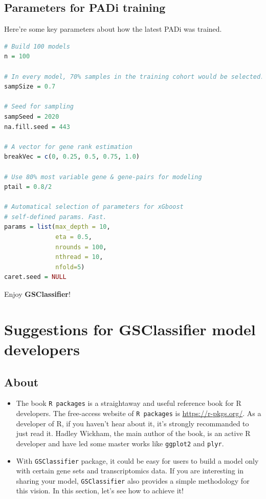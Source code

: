 \documentclass[
  12pt,
]{book}
\newcommand{\passthrough}[1]{#1}
\begin{document}
\hypertarget{padiPara}{%
\section{Parameters for PADi training}\label{padiPara}}

Here're some key parameters about how the latest PADi was trained.

\begin{lstlisting}[language=R]
# Build 100 models
n = 100

# In every model, 70% samples in the training cohort would be selected.
sampSize = 0.7

# Seed for sampling
sampSeed = 2020
na.fill.seed = 443

# A vector for gene rank estimation
breakVec = c(0, 0.25, 0.5, 0.75, 1.0)

# Use 80% most variable gene & gene-pairs for modeling
ptail = 0.8/2

# Automatical selection of parameters for xGboost
# self-defined params. Fast.
params = list(max_depth = 10,
              eta = 0.5,
              nrounds = 100,
              nthread = 10,
              nfold=5)
caret.seed = NULL
\end{lstlisting}

Enjoy \textbf{GSClassifier}!

\hypertarget{suggestions-for-gsclassifier-model-developers}{%
\chapter{Suggestions for GSClassifier model developers}\label{suggestions-for-gsclassifier-model-developers}}

\hypertarget{about-3}{%
\section{About}\label{about-3}}

\begin{itemize}
\item
  The book \passthrough{\lstinline!R packages!} is a straightaway and useful reference book for R developers. The free-access website of \passthrough{\lstinline!R packages!} is \url{https://r-pkgs.org/}. As a developer of R, if you haven't hear about it, it's strongly recommanded to just read it. Hadley Wickham, the main author of the book, is an active R developer and have led some master works like \passthrough{\lstinline!ggplot2!} and \passthrough{\lstinline!plyr!}.
\item
  With \passthrough{\lstinline!GSClassifier!} package, it could be easy for users to build a model only with certain gene sets and transcriptomics data. If you are interesting in sharing your model, \passthrough{\lstinline!GSClassifier!} also provides a simple methodology for this vision. In this section, let's see how to achieve it!
\end{itemize}
\end{document}
